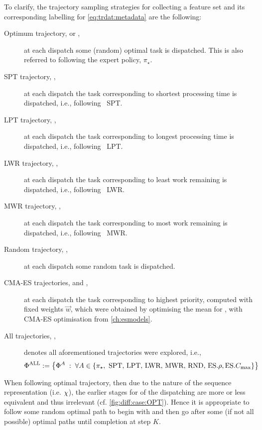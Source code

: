 \clearpage
To clarify, the trajectory sampling strategies for collecting a feature set and 
its corresponding labelling for \cref{eq:trdat:metadata} are the following:
\begin{description}
    \item[Optimum trajectory, \PhiSet{\OPT} or \PhiSet{\pi_\star},] at each 
    dispatch some (random) optimal task is dispatched. This is also referred to 
    following the expert policy, $\pi_\star$.
    \item[SPT trajectory, \PhiSet{\SPT},] at each dispatch the task 
    corresponding to shortest processing time is dispatched, i.e., following 
    \sdr~SPT.
    \item[LPT trajectory, \PhiSet{\LPT},] at each dispatch the task 
    corresponding to longest processing time is dispatched, i.e., following 
    \sdr~LPT.
    \item[LWR trajectory, \PhiSet{\LWR},] at each dispatch the task 
    corresponding to least work remaining is dispatched, i.e., following 
    \sdr~LWR.
    \item[MWR trajectory, \PhiSet{\MWR},] at each dispatch the task 
    corresponding to most work remaining is dispatched, i.e., following 
    \sdr~MWR.
    \item[Random trajectory, \PhiSet{\RND},] at each dispatch some random task 
    is dispatched.
    \item[CMA-ES trajectories, \PhiSet{\minRho} and \PhiSet{\minCmax},] at each 
    dispatch the task  corresponding to highest priority, computed with fixed 
    weights $\vec{w}$, which were obtained by optimising the mean for 
    \fullnamerho, with CMA-ES optimisation from \cref{ch:esmodels}. 
    \item[All trajectories, \PhiSet{\ALL},] denotes all aforementioned 
    trajectories were explored, i.e., 
    \begin{equation} \nonumber
    \Phi^{\text{ALL}}:=\left\{\Phi^{A}\;:\;\forall A \in 
    \left\{\pi_\star,\text{~SPT,~LPT,~LWR,~MWR,~RND,~}\text{ES}.{\rho},\text{ES}.{C_{\max}}\right\}\right\}
    \end{equation}
\end{description}

When following optimal trajectory, then due to the nature of the sequence 
representation (i.e. ${\mathbf{\chi}}$), the earlier stages for  of 
the dispatching are more or less equivalent and thus irrelevant (cf. 
\cref{fig:diff:case:OPT}). 
Hence it is appropriate to follow some random optimal path to begin with and 
then go after some (if not all possible) optimal paths until completion at step 
$K$. 

